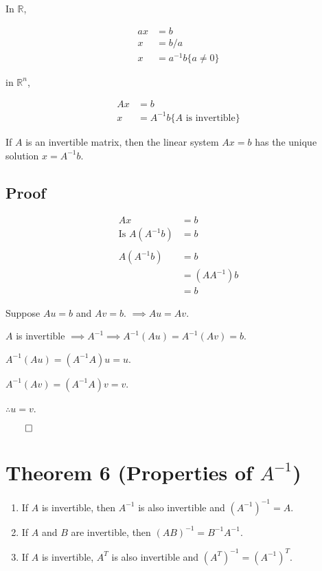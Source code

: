 \documentclass[12pt]{article}
\begin{document}
In $\mathbb{R}$, 

\begin{align*}
  ax &= b \\
  x &= b/a \\
  x &= a^{-1}b \{ a \neq 0 \}
\end{align*}

in $\mathbb{R}^n$,

\begin{align*}
  Ax &= b \\
  x &= A^{-1}b \{ A \text{ is invertible} \}
\end{align*}

If $A$ is an invertible matrix, then the linear system $Ax=b$ has the unique
solution $x = A^{-1}b$.

\subsection{Proof}

\begin{align*}
  Ax &= b \\
  \text{Is } A(A^{-1}b) &= b \\
  \\
  A(A^{-1}b) &= b \\
             &= (A A^{-1})b \\
             &= b 
\end{align*}

Suppose $Au = b$ and $Av = b$. $\implies Au = Av$.

$A$ is invertible $\implies A^{-1} \implies A^{-1} (Au) = A^{-1} (Av) = b$.

$A^{-1} (Au) = (A^{-1}A)u = u$.

$A^{-1} (Av) = (A^{-1}A)v = v$.

$\therefore u = v$.

$\qed$

\section{Theorem 6 (Properties of $A^{-1}$)}

\begin{enumerate}[label=(\alph*)]
  \item If $A$ is invertible, then $A^{-1}$ is also invertible and $(A^{-1})^{-1} = A$.
  \item If $A$ and $B$ are invertible, then $(AB)^{-1} = B^{-1}A^{-1}$.
  \item If $A$ is invertible, $A^T$ is also invertible and $(A^T)^{-1} = (A^{-1})^T$.
\end{enumerate}
\end{document}
